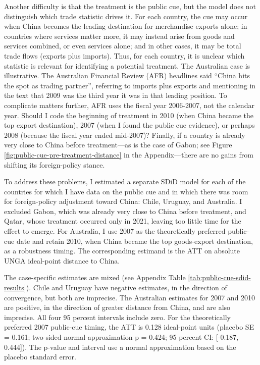 \documentclass[referee,pdflatex,sn-basic]{sn-jnl}
\theoremstyle{thmstylethree}
\begin{document}
Another difficulty is that the treatment is the public cue, but the model does not distinguish which trade statistic drives it. For each country, the cue may occur when China becomes the leading destination for merchandise exports alone; in countries where services matter more, it may instead arise from goods and services combined, or even services alone; and in other cases, it may be total trade flows (exports plus imports). Thus, for each country, it is unclear which statistic is relevant for identifying a potential treatment. The Australian case is illustrative. The Australian Financial Review (AFR) headlines said ``China hits the spot as trading partner'', referring to imports plus exports and mentioning in the text that 2009 was the third year it was in that leading position. To complicate matters further, AFR uses the fiscal year 2006-2007, not the calendar year. Should I code the beginning of treatment in 2010 (when China became the top export destination), 2007 (when I found the public cue evidence), or perhaps 2008 (because the fiscal year ended mid-2007)? Finally, if a country is already very close to China before treatment---as is the case of Gabon; see Figure \ref{fig:public-cue-pre-treatment-distance} in the Appendix---there are no gains from shifting its foreign-policy stance.

To address these problems, I estimated a separate SDiD model for each of the countries for which I have data on the public cue and in which there was room for foreign-policy adjustment toward China: Chile, Uruguay, and Australia. I excluded Gabon, which was already very close to China before treatment, and Qatar, whose treatment occurred only in 2021, leaving too little time for the effect to emerge. For Australia, I use 2007 as the theoretically preferred public-cue date and retain 2010, when China became the top goods-export destination, as a robustness timing. The corresponding estimand is the ATT on absolute UNGA ideal-point distance to China.

The case-specific estimates are mixed (see Appendix Table \ref{tab:public-cue-sdid-results}). Chile and Uruguay have negative estimates, in the direction of convergence, but both are imprecise. The Australian estimates for 2007 and 2010 are positive, in the direction of greater distance from China, and are also imprecise. All four 95 percent intervals include zero. For the theoretically preferred 2007 public-cue timing, the ATT is 0.128 ideal-point units (placebo SE = 0.161; two-sided normal-approximation p = 0.424; 95 percent CI: {[}-0.187, 0.444{]}). The p-value and interval use a normal approximation based on the placebo standard error.
\end{document}
